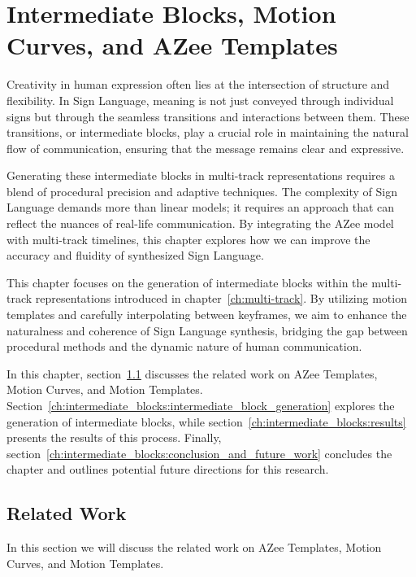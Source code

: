 \documentclass[../../main.tex]{subfiles}
\begin{document}
\chapter{Intermediate Blocks, Motion Curves, and AZee Templates}
\label{ch:intermediate_blocks}

Creativity in human expression often lies at the intersection of structure and flexibility. In Sign Language, meaning is not just conveyed through individual signs but through the seamless transitions and interactions between them. These transitions, or intermediate blocks, play a crucial role in maintaining the natural flow of communication, ensuring that the message remains clear and expressive.

Generating these intermediate blocks in multi-track representations requires a blend of procedural precision and adaptive techniques. The complexity of Sign Language demands more than linear models; it requires an approach that can reflect the nuances of real-life communication. By integrating the AZee model with multi-track timelines, this chapter explores how we can improve the accuracy and fluidity of synthesized Sign Language.

This chapter focuses on the generation of intermediate blocks within the multi-track representations introduced in chapter~\ref{ch:multi-track}. By utilizing motion templates and carefully interpolating between keyframes, we aim to enhance the naturalness and coherence of Sign Language synthesis, bridging the gap between procedural methods and the dynamic nature of human communication.

In this chapter, section~\ref{ch:intermediate_blocks:related_work} discusses the related work on AZee Templates, Motion Curves, and Motion Templates. Section~\ref{ch:intermediate_blocks:intermediate_block_generation} explores the generation of intermediate blocks, while section~\ref{ch:intermediate_blocks:results} presents the results of this process. Finally, section~\ref{ch:intermediate_blocks:conclusion_and_future_work} concludes the chapter and outlines potential future directions for this research.

\section{Related Work}
\label{ch:intermediate_blocks:related_work}

In this section we will discuss the related work on AZee Templates, Motion Curves, and Motion Templates. 
\end{document}
